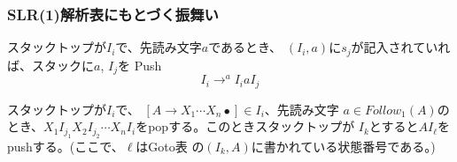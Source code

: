 \documentclass[dvipdfmx,cjk]{beamer}
\begin{document}
\begin{frame}
  \frametitle{SLR(1)解析表にもとづく振舞い}
  \begin{list}%
    {} %
    {} %
    \item[(1)] スタックトップが$I_i$で、先読み文字$a$であるとき、
          $(I_i,a)$に$s_j$が記入されていれば、スタックに$a$, $I_j$を
          Push
          \[
            I_i\rightarrow^a I_iaI_j
          \]
    \item[(2)] スタックトップが$I_i$で、
          $[A\rightarrow X_1\cdots X_n\bullet]\in I_i$、先読み文字
          $a\in Follow_1(A)$のとき、$X_1I_{j_1}X_2I_{j_2}\cdots
            X_nI_i$をpopする。このときスタックトップが
          $I_k$とすると$AI_\ell$をpushする。(ここで、$\ell$はGoto表
          の$(I_k,A)$に書かれている状態番号である。)
  \end{list}
\end{frame}
\end{document}
